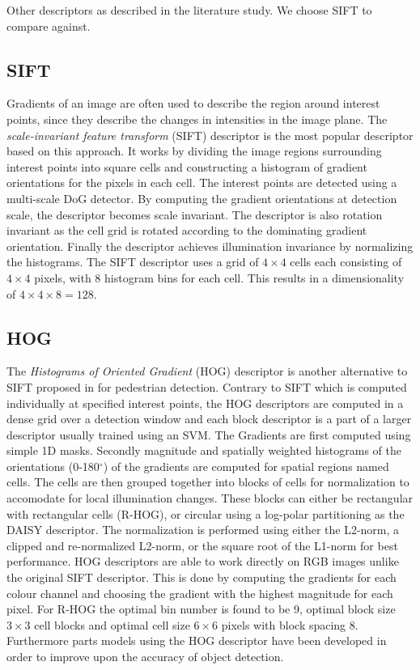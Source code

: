 \documentclass[thesis.tex]{subfiles}
\begin{document}
Other descriptors as described in the literature study. We choose SIFT to compare against.

\subsection{SIFT}

Gradients of an image are often used to describe the region around interest points, since they describe the changes in intensities in the image plane.
The \emph{scale-invariant feature transform} (SIFT) descriptor
\cite{lowe2004distinctive} is the most popular descriptor based on this
approach. It works by dividing the image regions surrounding interest
points into square cells and constructing a histogram of gradient
orientations for the pixels in each cell. The interest points are detected
using a multi-scale DoG detector. By computing the gradient orientations
at detection scale, the descriptor becomes scale invariant. The descriptor
is also rotation invariant as the cell grid is rotated according to the
dominating gradient orientation. Finally the descriptor achieves illumination
invariance by normalizing the histograms. The SIFT descriptor uses a grid of
$4 \times 4$ cells each consisting of $4 \times 4$ pixels, with 8 histogram
bins for each cell. This results in a dimensionality of $4 \times 4 \times 8 =
128$.


\subsection{HOG}

The \emph{Histograms of Oriented Gradient} (HOG) descriptor is another
alternative to SIFT proposed in \cite{dalal2005histograms} for pedestrian
detection. Contrary to SIFT which is computed individually at specified
interest points, the HOG descriptors are computed in a dense grid over a
detection window and each block descriptor is a part of a larger descriptor
usually trained using an SVM. The Gradients are first computed using simple
1D masks. Secondly magnitude and spatially weighted histograms of the
orientations (0-180$^{\circ}$) of the gradients are computed for spatial
regions named cells. The cells are
then grouped together into blocks of cells for normalization to accomodate
for local illumination changes. These blocks can either be rectangular with
rectangular cells (R-HOG), or circular using a log-polar partitioning as the
DAISY descriptor. The normalization is performed using either the L2-norm,
a clipped and re-normalized L2-norm, or the square root of the L1-norm for
best performance. HOG descriptors are able to work directly on RGB images
unlike the original SIFT descriptor. This is done by computing the gradients
for each colour channel and choosing the gradient with the highest magnitude
for each pixel. For R-HOG the optimal bin number is found to be 9, optimal
block size $3\times3$ cell blocks and optimal cell size $6\times6$ pixels
with block spacing 8.
Furthermore parts models using the HOG descriptor have been developed
\cite{felzenszwalb2008discriminatively} in order to improve upon the accuracy
of object detection.
\end{document}
